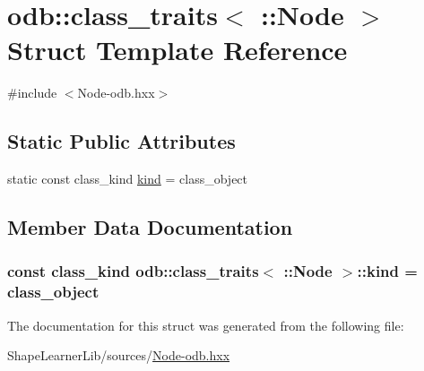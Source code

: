 \hypertarget{structodb_1_1class__traits_3_01_1_1_node_01_4}{}\section{odb\+:\+:class\+\_\+traits$<$ \+:\+:Node $>$ Struct Template Reference}
\label{structodb_1_1class__traits_3_01_1_1_node_01_4}


{\ttfamily \#include $<$Node-\/odb.\+hxx$>$}

\subsection*{Static Public Attributes}
\begin{DoxyCompactItemize}
\item 
static const class\+\_\+kind \hyperlink{structodb_1_1class__traits_3_01_1_1_node_01_4_a2725ce81ae003cb736e8bd920dde5c0e}{kind} = class\+\_\+object
\end{DoxyCompactItemize}


\subsection{Member Data Documentation}
\hypertarget{structodb_1_1class__traits_3_01_1_1_node_01_4_a2725ce81ae003cb736e8bd920dde5c0e}{}
\subsubsection[{kind}]{\setlength{\rightskip}{0pt plus 5cm}const class\+\_\+kind odb\+::class\+\_\+traits$<$ \+::{\bf Node} $>$\+::kind = class\+\_\+object\hspace{0.3cm}{\ttfamily [static]}}\label{structodb_1_1class__traits_3_01_1_1_node_01_4_a2725ce81ae003cb736e8bd920dde5c0e}


The documentation for this struct was generated from the following file\+:\begin{DoxyCompactItemize}
\item 
Shape\+Learner\+Lib/sources/\hyperlink{_node-odb_8hxx}{Node-\/odb.\+hxx}\end{DoxyCompactItemize}
